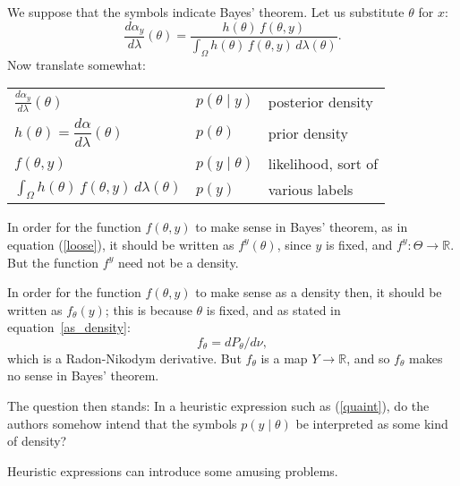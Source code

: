 \documentclass[
twoside=true,
paper=letter,
fontsize=9pt,
pagesize=auto,
leqno,
openany,
headsepline,
overfullrule,
]{scrbook}
\theoremstyle{plain}
\theoremstyle{plain}
\theoremstyle{definition}
\theoremstyle{bfnoteitalic}
\theoremstyle{bfnoteroman}
\newcommand{\R}{\mathbb{R}}
\newcommand{\funcf}{f}
\newcommand{\funch}{h}
\newcommand{\function}{f}
\newcommand{\measurespaceii}{Y}
\newcommand{\measnu}{\nu}
\newcommand{\measlambda}{\lambda}
\newcommand{\sspace}{\measurespaceii}%
\newcommand{\pspaceelt}{x}
\newcommand{\marginalone}{\alpha}%
\newcommand{\prior}{\marginalone}
\begin{document}
We suppose that the symbols indicate Bayes' theorem.
Let us substitute $\theta$ for $\pspaceelt$:
\begin{equation}\label{loose}
\frac{d \prior_y}{d\measlambda}(\theta)
=
\frac{\funch(\theta)\,\funcf(\theta,y)}
{\displaystyle
\int_{\Omega} \funch(\theta)\, \funcf(\theta,y)
\,d\measlambda(\theta)}.
\end{equation}
Now translate somewhat:
\begin{center}
\renewcommand{\arraystretch}{1.6}
\begin{tabular}{lll}
\toprule
$\displaystyle\frac{d \prior_y}{d\measlambda}(\theta)$ & $p(\theta\mid y)$ & posterior density \\
$\funch(\theta) = \dfrac{d\prior}{d\measlambda}(\theta)$
& $p(\theta)$ & prior density \\
$\funcf(\theta,y)$ & $p(y\mid\theta)$ & likelihood, sort of \\
$\int_{\Omega} \funch(\theta)\,\funcf(\theta,y)\,d\measlambda(\theta)$ & $p(y)$ & various labels \\
\bottomrule
\end{tabular}
\end{center}

In order for the function $\funcf(\theta,y)$ to  make sense in Bayes' theorem, as in equation (\ref{loose}), it should be written as $\funcf^y(\theta)$, since $y$ is fixed, and
$\funcf^y : \Theta \to \R$.
But the function $\funcf^y$ need not be a density.

In order for the function
$\funcf(\theta,y)$ to make sense as a density then, it should be written as $\funcf_\theta(y)$; this is because $\theta$ is fixed, and
as stated in equation~\ref{as_density}:
\[\function_\theta
=
d P_\theta/d\measnu,
\]
which is  a Radon-Nikodym derivative.
But $\function_\theta$ is a map $\sspace\to\R$, and so $\function_\theta$ makes no sense in Bayes' theorem.

The question then stands: In a heuristic expression such as (\ref{quaint}), do the authors  somehow intend that the symbols $p(y\mid\theta)$ be interpreted as some kind of density?

Heuristic expressions can introduce some amusing problems.








\end{document}
